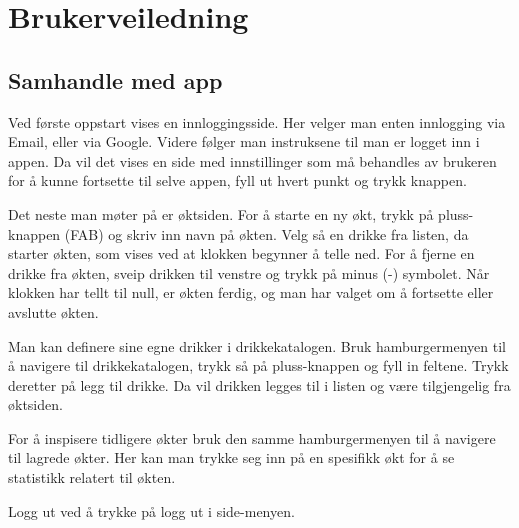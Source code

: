 \section{Brukerveiledning}
\subsection{Samhandle med app}
Ved første oppstart vises en innloggingsside. Her velger man enten innlogging via Email, eller via Google. Videre følger man instruksene til man er logget inn i appen. Da vil det vises en side med innstillinger som må behandles av brukeren for å kunne fortsette til selve appen, fyll ut hvert punkt og trykk knappen.

Det neste man møter på er øktsiden. For å starte en ny økt, trykk på pluss-knappen (FAB) og skriv inn navn på økten. Velg så en drikke fra listen, da starter økten, som vises ved at klokken begynner å telle ned. For å fjerne en drikke fra økten, sveip drikken til venstre og trykk på minus (-) symbolet. Når klokken har tellt til null, er økten ferdig, og man har valget om å fortsette eller avslutte økten.

Man kan definere sine egne drikker i drikkekatalogen. Bruk hamburgermenyen til å navigere til drikkekatalogen, trykk så på pluss-knappen og fyll in feltene. Trykk deretter på legg til drikke. Da vil drikken legges til i listen og være tilgjengelig fra øktsiden.

For å inspisere tidligere økter bruk den samme hamburgermenyen til å navigere til lagrede økter. Her kan man trykke seg inn på en spesifikk økt for å se statistikk relatert til økten.

Logg ut ved å trykke på logg ut i side-menyen.
